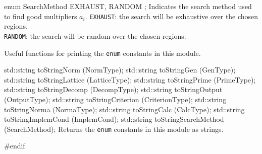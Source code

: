 {enum SearchMethod { EXHAUST, RANDOM };
\endcode
\tab
 Indicates the search method used to find good multipliers $a_i$.
\endtab
\tabb
  \texttt{EXHAUST}:  the search will be exhaustive over the chosen regions.\\[1ex]
  \texttt{RANDOM}:  the search will be random over the chosen regions.
\endtabb



Useful functions for printing the \texttt{enum} constants in this module.
\code

std::string toStringNorm (NormType);
std::string toStringGen (GenType);
std::string toStringLattice (LatticeType);
std::string toStringPrime (PrimeType);
std::string toStringDecomp (DecompType);
std::string toStringOutput (OutputType);
std::string toStringCriterion (CriterionType);
std::string toStringNorma (NormaType);
std::string toStringCalc (CalcType);
std::string toStringImplemCond (ImplemCond);
std::string toStringSearchMethod (SearchMethod);
\endcode
\tab
Returns the \texttt{enum} constants in this module as strings. 
\endtab
\code

}
\hide
#endif
\endhide
\endcode
